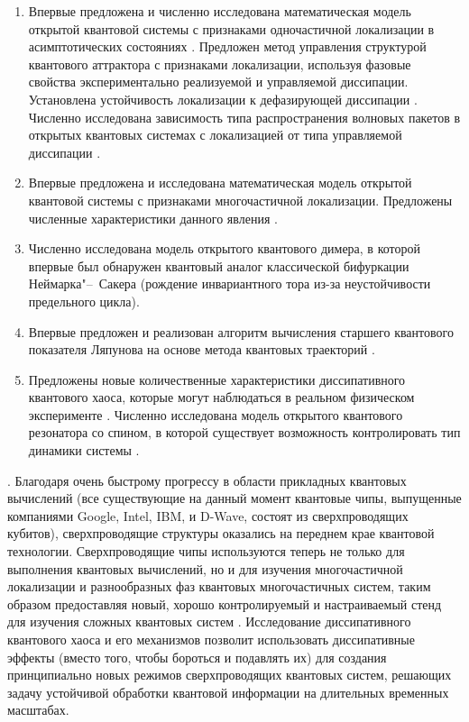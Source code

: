{\novelty}
\begin{enumerate}[beginpenalty=10000] %
	\item Впервые предложена и численно исследована математическая модель открытой квантовой системы с признаками одночастичной локализации в асимптотических состояниях \cite{Yusipov2017}. 
	Предложен метод управления структурой квантового аттрактора с признаками локализации, используя фазовые свойства экспериментально реализуемой и управляемой диссипации. 
	Установлена устойчивость локализации к дефазирующей диссипации \cite{Vershinina2017}.
	Численно исследована зависимость типа распространения волновых пакетов в открытых квантовых системах с локализацией от типа управляемой диссипации \cite{Yusipov2018}.
	\item Впервые предложена и исследована математическая модель открытой квантовой системы с признаками многочастичной локализации. Предложены численные характеристики данного явления \cite{Vakulchyk2018}.
	\item Численно исследована модель открытого квантового димера, в которой впервые был обнаружен квантовый аналог классической бифуркации Неймарка"--~Сакера \cite{Yusipov2019_1} (рождение инвариантного тора из-за неустойчивости предельного цикла).
	\item Впервые предложен и реализован алгоритм вычисления старшего квантового показателя Ляпунова на основе метода квантовых траекторий \cite{Yusipov2019_2}.
	\item Предложены новые количественные характеристики диссипативного квантового хаоса, которые могут наблюдаться в реальном физическом эксперименте \cite{Yusipov2020}. Численно исследована модель открытого квантового резонатора со спином, в которой существует возможность контролировать тип динамики системы \cite{Yusipov2021}.
\end{enumerate}

{\influence}. Благодаря очень быстрому прогрессу в области прикладных квантовых вычислений (все существующие на данный момент квантовые чипы, выпущенные компаниями Google, Intel, IBM, и D-Wave, состоят из сверхпроводящих кубитов), сверхпроводящие структуры оказались на переднем крае квантовой технологии. 
Сверхпроводящие чипы используются теперь не только для выполнения квантовых вычислений, но и для изучения многочастичной локализации \autocite{Roushan2017} и разнообразных фаз квантовых многочастичных систем, таким образом предоставляя новый, хорошо контролируемый и настраиваемый стенд для изучения сложных квантовых систем \autocite{Barends2015}. 
Исследование диссипативного квантового хаоса и его механизмов позволит использовать диссипативные эффекты (вместо того, чтобы бороться и подавлять их) для создания принципиально новых режимов сверхпроводящих квантовых систем, решающих задачу устойчивой обработки квантовой информации на длительных временных масштабах.

